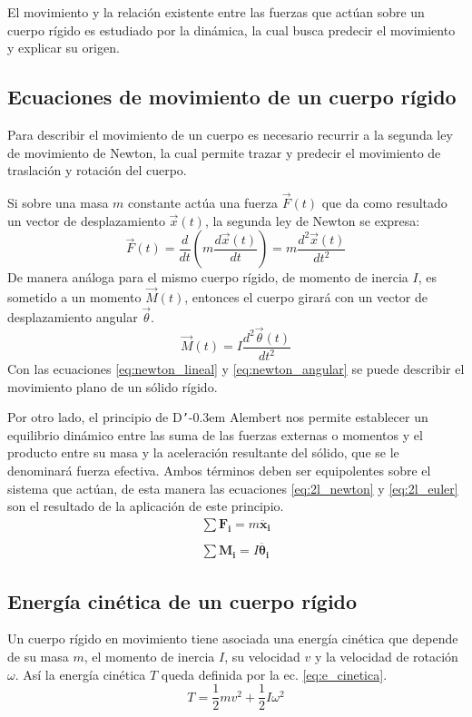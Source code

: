 El movimiento y la relación existente entre las fuerzas que actúan sobre un cuerpo rígido es estudiado por la dinámica, la cual busca predecir el movimiento y explicar su origen. 

\subsection{Ecuaciones de movimiento de un cuerpo rígido}
\label{sec:ec_mov}
Para describir el movimiento de un cuerpo es necesario recurrir a la segunda ley de movimiento de Newton, la cual permite trazar y predecir el movimiento de traslación y rotación del cuerpo.

Si sobre una masa $m$ constante actúa una fuerza $\vec{F}(t)$ que da como resultado un vector de desplazamiento $\vec{x}(t)$, la segunda ley de Newton se expresa:
\begin{equation}\label{eq:newton_lineal}
	\vec{F}(t) = \frac{d}{dt}\left(m\frac{d\vec{x}(t)}{dt}\right) = m \frac{d^2\vec{x}(t)}{dt^2}
\end{equation}
De manera análoga para el mismo cuerpo rígido, de momento de inercia $I$, es sometido a un momento $\vec{M}(t)$, entonces el cuerpo girará con un vector de desplazamiento angular $\vec{\theta}$.
\begin{equation}\label{eq:newton_angular}
	\vec{M}(t) = I\frac{d^2\vec{\theta}(t)}{dt^2}
\end{equation} 
Con las ecuaciones \ref{eq:newton_lineal} y \ref{eq:newton_angular} se puede describir el movimiento plano de un sólido rígido.

Por otro lado, el principio de D\texttt{'}\kern-0.3em Alembert nos permite establecer un equilibrio dinámico entre las suma de las fuerzas externas o momentos y el producto entre su masa y la aceleración resultante del sólido, que se le denominará fuerza efectiva. Ambos términos deben ser equipolentes sobre el sistema que actúan, de esta manera las ecuaciones \ref{eq:2l_newton} y \ref{eq:2l_euler} son el resultado de la aplicación de este principio.
\begin{gather}
	\sum \mathbf{F_i} = m\mathbf{\ddot{x_i}} \label{eq:2l_newton}\\
	\nonumber \\
	\sum \mathbf{M_i} = I\mathbf{\ddot{\theta_i}} \label{eq:2l_euler}
\end{gather}

\subsection{Energía cinética de un cuerpo rígido}
Un cuerpo rígido en movimiento tiene asociada una energía cinética que depende de su masa $m$, el momento de inercia $I$, su velocidad $v$ y la velocidad de rotación $\omega$. Así la energía cinética $T$ queda definida por la ec. \ref{eq:e_cinetica}.
\begin{equation}\label{eq:e_cinetica}
	T = \frac{1}{2}mv^2 + \frac{1}{2}I\omega^2 
\end{equation}


